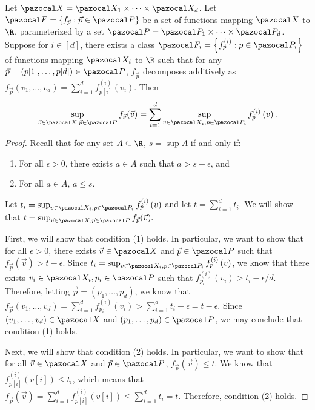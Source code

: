 \begin{lemma}\label{lem:product}
Let $\domain = \domain_1 \times \cdots \times \domain_d$. Let $\fclass = \left\{f_{\vec{p}} : \vec{p} \in \pspace\right\}$ be a set of functions mapping $\domain$ to $\R$, parameterized by a set $\pspace = \pspace_1 \times \cdots \times \pspace_d$.
Suppose for $i \in [d]$, there exists a class $\fclass_i = \left\{f_p^{(i)} : p \in \pspace_i\right\}$ of functions mapping $\domain_i$ to $\R$ such that for any $\vec{p} = \left(p[1], \dots, p[d]\right) \in \pspace$, $f_{\vec{p}}$ decomposes additively as $f_{\vec{p}}\left(v_1, \dots, v_d\right) = \sum_{i = 1}^d f^{(i)}_{p[i]}\left(v_i\right)$. Then \[\sup_{\vec{v} \in \domain, \vec{p} \in \pspace} f_{\vec{p}}(\vec{v}) = \sum_{i = 1}^d \sup_{v \in \domain_i, p \in \pspace_i} f^{(i)}_{p}\left(v\right).\]
\end{lemma}

\begin{proof}
Recall that for any set $A \subseteq \R$, $s = \sup A$ if and only if:
\begin{enumerate}
\item For all $\epsilon > 0$, there exists $a \in A$ such that $a > s - \epsilon$, and
\item For all $a \in A$, $a \leq s$.
\end{enumerate}

Let $t_i = \sup_{v \in \domain_i, p \in \pspace_i} f^{(i)}_{p}\left(v\right)$ and let $t = \sum_{i=1}^d t_i$. We will show that $t = \sup_{\vec{v} \in \domain, \vec{p} \in \pspace} f_{\vec{p}}(\vec{v}).$

First, we will show that condition (1) holds. In particular, we want to show that for all $\epsilon > 0$, there exists $\vec{v} \in \domain$ and $\vec{p} \in \pspace$ such that $f_{\vec{p}}(\vec{v}) > t - \epsilon$. Since $t_i = \sup_{v \in \domain_i, p \in \pspace_i} f^{(i)}_{p}\left(v\right)$, we know that there exists $v_i \in \domain_i, p_i \in \pspace$ such that $ f^{(i)}_{p_i }\left(v_i\right) > t_i - \epsilon / d$. Therefore, letting $\vec{p} = \left(p_1, \dots, p_d\right)$, we know that $f_{\vec{p}}\left(v_1, \dots, v_d\right) = \sum_{i = 1}^d f^{(i)}_{p_i}\left(v_i\right) > \sum_{i = 1}^d t_i - \epsilon = t-\epsilon.$ Since $\left(v_1, \dots, v_d\right) \in \domain$ and $\left(p_1, \dots, p_d\right) \in \pspace$, we may conclude that condition (1) holds.

Next, we will show that condition (2) holds. In particular, we want to show that for all $\vec{v} \in \domain$ and $\vec{p} \in \pspace$, $f_{\vec{p}}(\vec{v}) \leq t$. We know that $f^{(i)}_{p[i]}\left(v[i]\right) \leq t_i$, which means that $f_{\vec{p}}(\vec{v}) = \sum_{i = 1}^d f^{(i)}_{p[i]}\left(v[i]\right) \leq \sum_{i = 1}^d t_i =t.$ Therefore, condition (2) holds.
\end{proof}

